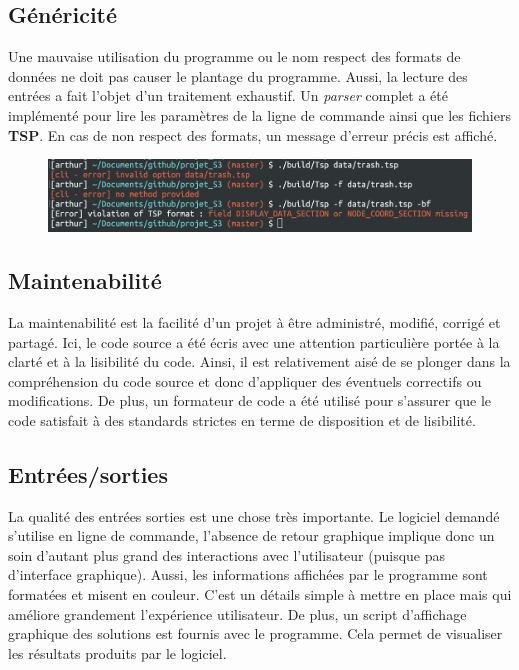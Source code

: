 \documentclass[11pt]{article}
\begin{document}
\subsection*{Généricité}

Une mauvaise utilisation du programme ou le nom respect des formats de données ne doit pas causer le plantage du programme. Aussi, la lecture des entrées a fait l'objet d'un traitement exhaustif. Un \textit{parser} complet a été implémenté pour lire les paramètres de la ligne de commande ainsi que les fichiers \textbf{TSP}. En cas de non respect des formats, un message d'erreur précis est affiché. 

\begin{figure}[H]
	\includegraphics[scale=0.5]{capture.png}
\end{figure}

\subsection*{Maintenabilité}

La maintenabilité est la facilité d'un projet à être administré, modifié, corrigé et partagé. Ici, le code source a été écris avec une attention particulière portée à la clarté et à la lisibilité du code. Ainsi, il est relativement aisé de se plonger dans la compréhension du code source et donc d'appliquer des éventuels correctifs ou modifications. De plus, un formateur de code a été utilisé pour s'assurer que le code satisfait à des standards strictes en terme de disposition et de lisibilité.

\subsection*{Entrées/sorties}

La qualité des entrées sorties est une chose très importante. Le logiciel demandé s'utilise en ligne de commande, l'absence de retour graphique implique donc un soin d'autant plus grand des interactions avec l'utilisateur (puisque pas d'interface graphique). Aussi, les informations affichées par le programme sont formatées et misent en couleur. C'est un détails simple à mettre en place mais qui améliore grandement l'expérience utilisateur. De plus, un script d'affichage graphique des solutions est fournis avec le programme. Cela permet de visualiser les résultats produits par le logiciel.
\end{document}

